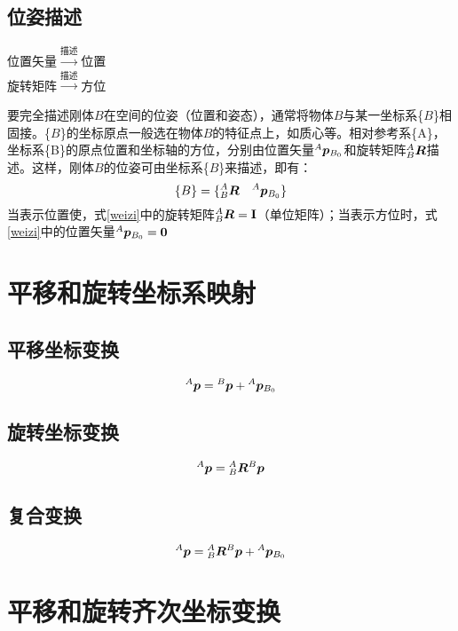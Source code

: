 \subsection{位姿描述}
\begin{center}
位置矢量$\xrightarrow{描述}$位置\\
旋转矩阵$\xrightarrow{描述}$方位
\end{center}
要完全描述刚体$B$在空间的位姿（位置和姿态），通常将物体$B$与某一坐标系\{$B$\}相固接。\{$B$\}的坐标原点一般选在物体$B$的特征点上，如质心等。相对参考系\{A\}，坐标系\{B\}的原点位置和坐标轴的方位，分别由位置矢量$\djb{p}{A}{B_0}$和旋转矩阵$\zb{R}{A}{B}$描述。这样，刚体$B$的位姿可由坐标系\{$B$\}来描述，即有：
\begin{equation}
\{B\}=\{\zb{R}{A}{B} \quad \djb{p}{A}{B_0} \}\label{weizi}
\end{equation}
当表示位置使，式\eqref{weizi}中的旋转矩阵$\zb{R}{A}{B}=\mathbf{I}$（单位矩阵）；当表示方位时，式\eqref{weizi}中的位置矢量$\djb{p}{A}{B_0}=\mathbf{0}$
\section{平移和旋转坐标系映射}
\subsection{平移坐标变换}
\begin{equation}
\zsb{p}{A}=\zsb{p}{B}+\djb{p}{A}{B_0}
\end{equation}
\subsection{旋转坐标变换}
\begin{equation}
\zsb{p}{A}=\zb{R}{A}{B}\zsb{p}{B}
\end{equation}
\subsection{复合变换}
\begin{equation}
\zsb{p}{A}=\zb{R}{A}{B}\zsb{p}{B}+\djb{p}{A}{B_0}
\end{equation}
\section{平移和旋转齐次坐标变换}
